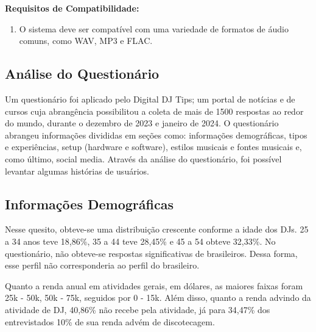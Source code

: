 \textbf{Requisitos de Compatibilidade:}
\begin{enumerate}[label=\textbullet]
\item O sistema deve ser compatível com uma variedade de formatos de áudio comuns, como WAV, MP3 e FLAC.
\end{enumerate}

\subsection{Análise do Questionário}

Um questionário foi aplicado pelo Digital DJ Tips; um portal de notícias e de cursos cuja abrangência possibilitou a coleta de mais de 1500 respostas ao redor do mundo, durante o dezembro de 2023 e janeiro de 2024. O questionário abrangeu informações divididas em seções como: informações demográficas, tipos e experiências, setup (hardware e software), estilos musicais e fontes musicais e, como último, social media. Através da análise do questionário, foi possível levantar algumas histórias de usuários. 

\subsection{Informações Demográficas}
Nesse quesito, obteve-se uma distribuição crescente conforme a idade dos DJs. 25 a 34 anos teve 18,86\%, 35 a 44 teve 28,45\% e 45 a 54 obteve 32,33\%. No questionário, não obteve-se respostas significativas de brasileiros. Dessa forma, esse perfil não corresponderia ao perfil do brasileiro.
\par
Quanto a renda anual em atividades gerais, em dólares, as maiores faixas foram 25k - 50k, 50k - 75k, seguidos por 0 - 15k. Além disso, quanto a renda advindo da atividade de DJ, 40,86\% não recebe pela atividade, já para 34,47\% dos entrevistados 10\% de sua renda advém de discotecagem.

